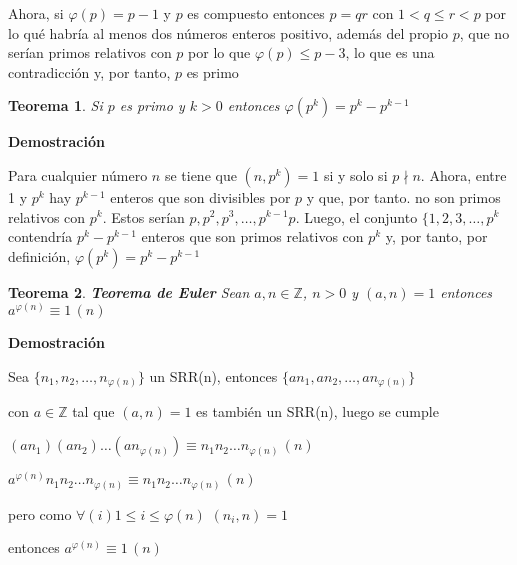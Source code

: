 \documentclass[a4paper,12pt]{report}
\newtheorem*{teo}{Teorema}
\begin{document}
Ahora, si $\varphi(p)=p-1$ y $p$ es compuesto entonces $p=qr$ con $1<q\leq r <p$ por lo qué habría al menos dos números enteros positivo, además del propio $p$, que no serían primos relativos con $p$ por lo que $\varphi(p)\leq p-3$, lo que es una contradicción y, por tanto, $p$ es primo

\begin{teo}
 Si $p$ es primo y $k>0$ entonces $\varphi(p^k)=p^k - p^{k-1}$ 
\end{teo}

\textbf{Demostración}

Para cualquier número $n$ se tiene que $(n,p^k)=1$ si y solo si $p\nmid n$. Ahora, entre 1 y $p^k$ hay $p^{k-1}$ enteros que son divisibles por $p$ y que, por tanto. no son primos relativos con $p^k$. Estos serían $p,p^2,p^3,\dots,p^{k-1}p$. Luego, el conjunto $\{1,2,3,\dots,p^k$ contendría $p^k-p^{k-1}$ enteros que son primos relativos con $p^k$ y, por tanto, por definición, $\varphi(p^k)=p^k - p^{k-1}$ 

\begin{teo}
 \textbf{Teorema de Euler} Sean $a,n\in\mathbb{Z}$, $n>0$ y $(a,n)=1$ entonces $a^{\varphi(n)}\equiv 1\, (n)$
\end{teo}

\textbf{Demostración}

Sea $\{n_1,n_2,\dots,n_{\varphi(n)}\}$ un SRR(n), entonces $\{an_1,an_2,\dots,an_{\varphi(n)}\}$ 

con $a\in\mathbb{Z}$ tal que $(a,n)=1$ es también un SRR(n), luego se cumple

$(an_1)(an_2)\dots(an_{\varphi(n)})\equiv n_1 n_2 \dots n_{\varphi(n)} \, (n)$

$a^{\varphi(n)}n_1 n_2\dots n_{\varphi(n)}\equiv n_1 n_2 \dots n_{\varphi(n)} \, (n)$

pero como $\forall(i) 1\leq i\leq \varphi(n)$ $(n_i,n)=1$

entonces $a^{\varphi(n)}\equiv 1\, (n)$
\end{document}
